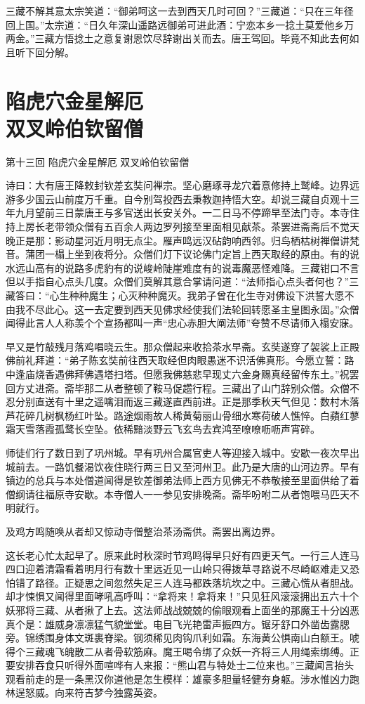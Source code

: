 \documentclass[12pt,UTF8]{ctexbook}
\begin{document}
{三藏不解其意太宗笑道：“御弟呵这一去到西天几时可回？”三藏道：“只在三年径回上国。”太宗道：“日久年深山遥路远御弟可进此酒：宁恋本乡一捻土莫爱他乡万两金。”三藏方悟捻土之意复谢恩饮尽辞谢出关而去。唐王驾回。毕竟不知此去何如且听下回分解。

\chapter[陷虎穴金星解厄\ 双叉岭伯钦留僧]{陷虎穴金星解厄\\双叉岭伯钦留僧}

第十三回 陷虎穴金星解厄 双叉岭伯钦留僧

诗曰：大有唐王降敕封钦差玄奘问禅宗。坚心磨琢寻龙穴着意修持上鹫峰。边界远游多少国云山前度万千重。自今别驾投西去秉教迦持悟大空。却说三藏自贞观十三年九月望前三日蒙唐王与多官送出长安关外。一二日马不停蹄早至法门寺。本寺住持上房长老带领众僧有五百余人两边罗列接至里面相见献茶。茶罢进斋斋后不觉天晚正是那：影动星河近月明无点尘。雁声鸣远汉砧韵响西邻。归鸟栖枯树禅僧讲梵音。蒲团一榻上坐到夜将分。众僧们灯下议论佛门定旨上西天取经的原由。有的说水远山高有的说路多虎豹有的说峻岭陡崖难度有的说毒魔恶怪难降。三藏钳口不言但以手指自心点头几度。众僧们莫解其意合掌请问道：“法师指心点头者何也？”三藏答曰：“心生种种魔生；心灭种种魔灭。我弟子曾在化生寺对佛设下洪誓大愿不由我不尽此心。这一去定要到西天见佛求经使我们法轮回转愿圣主皇图永固。”众僧闻得此言人人称羡个个宣扬都叫一声“忠心赤胆大阐法师”夸赞不尽请师入榻安寐。

早又是竹敲残月落鸡唱晓云生。那众僧起来收拾茶水早斋。玄奘遂穿了袈裟上正殿佛前礼拜道：“弟子陈玄奘前往西天取经但肉眼愚迷不识活佛真形。今愿立誓：路中逢庙烧香遇佛拜佛遇塔扫塔。但愿我佛慈悲早现丈六金身赐真经留传东土。”祝罢回方丈进斋。斋毕那二从者整顿了鞍马促趱行程。三藏出了山门辞别众僧。众僧不忍分别直送有十里之遥噙泪而返三藏遂直西前进。正是那季秋天气但见：数村木落芦花碎几树枫杨红叶坠。路途烟雨故人稀黄菊丽山骨细水寒荷破人憔悴。白蘋红蓼霜天雪落霞孤鹜长空坠。依稀黯淡野云飞玄鸟去宾鸿至嘹嘹呖呖声宵碎。

师徒们行了数日到了巩州城。早有巩州合属官吏人等迎接入城中。安歇一夜次早出城前去。一路饥餐渴饮夜住晓行两三日又至河州卫。此乃是大唐的山河边界。早有镇边的总兵与本处僧道闻得是钦差御弟法师上西方见佛无不恭敬接至里面供给了着僧纲请往福原寺安歇。本寺僧人一一参见安排晚斋。斋毕吩咐二从者饱喂马匹天不明就行。

及鸡方鸣随唤从者却又惊动寺僧整治茶汤斋供。斋罢出离边界。

这长老心忙太起早了。原来此时秋深时节鸡鸣得早只好有四更天气。一行三人连马四口迎着清霜看着明月行有数十里远近见一山岭只得拨草寻路说不尽崎岖难走又恐怕错了路径。正疑思之间忽然失足三人连马都跌落坑坎之中。三藏心慌从者胆战。却才悚惧又闻得里面哮吼高呼叫：“拿将来！拿将来！”只见狂风滚滚拥出五六十个妖邪将三藏、从者揪了上去。这法师战战兢兢的偷眼观看上面坐的那魔王十分凶恶真个是：雄威身凛凛猛气貌堂堂。电目飞光艳雷声振四方。锯牙舒口外凿齿露腮旁。锦绣围身体文斑裹脊梁。钢须稀见肉钩爪利如霜。东海黄公惧南山白额王。唬得个三藏魂飞魄散二从者骨软筋麻。魔王喝令绑了众妖一齐将三人用绳索绑缚。正要安排吞食只听得外面喧哗有人来报：“熊山君与特处士二位来也。”三藏闻言抬头观看前走的是一条黑汉你道他是怎生模样：雄豪多胆量轻健夯身躯。涉水惟凶力跑林逞怒威。向来符吉梦今独露英姿。

}
\end{document}
